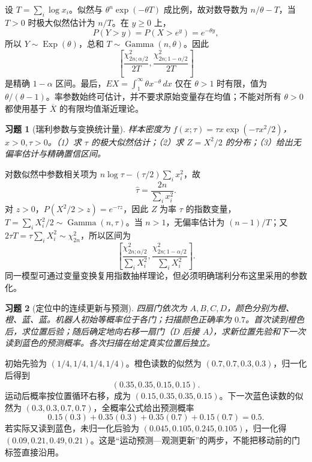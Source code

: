 \documentclass[UTF8,12pt,a4paper,fontset=fandol]{ctexart}
\newtheorem{exercise}{习题}[section]
\begin{document}
\begin{solve}\label{a:M-F-5}设 $T=\sum_i\log x_i$。似然与 $\theta^n\exp(-\theta T)$ 成比例，故对数导数为 $n/\theta-T$，当 $T>0$ 时极大似然估计为 $n/T$。在 $y\ge0$ 上，\[P(Y>y)=P(X>e^y)=e^{-\theta y},\]所以 $Y\sim\operatorname{Exp}(\theta)$，总和 $T\sim\operatorname{Gamma}(n,\theta)$。因此\[\left[\frac{\chi^2_{2n;\alpha/2}}{2T},\frac{\chi^2_{2n;1-\alpha/2}}{2T}\right]\]是精确 $1-\alpha$ 区间。最后，$EX=\int_1^\infty\theta x^{-\theta}\,dx$ 仅在 $\theta>1$ 时有限，值为 $\theta/(\theta-1)$。率参数始终可估计，并不要求原始变量存在均值；不能对所有 $\theta>0$ 都使用基于 $\overline X$ 的有限均值渐近理论。\end{solve}

\begin{exercise}[瑞利参数与变换统计量]\label{q:M-PF-26}
样本密度为 $f(x;\tau)=\tau x\exp(-\tau x^2/2)$，$x>0,\tau>0$。（1）求 $\tau$ 的极大似然估计；（2）求 $Z=X^2/2$ 的分布；（3）给出无偏率估计与精确置信区间。\par{}
\end{exercise}

\begin{solve}\label{a:M-PF-26}对数似然中参数相关项为 $n\log\tau-(\tau/2)\sum_i x_i^2$，故\[\widehat\tau=\frac{2n}{\sum_i x_i^2}.\]对 $z>0$，$P(X^2/2>z)=e^{-\tau z}$，因此 $Z$ 为率 $\tau$ 的指数变量，$T=\sum_iX_i^2/2\sim\operatorname{Gamma}(n,\tau)$。当 $n>1$，无偏率估计为 $(n-1)/T$；又 $2\tau T=\tau\sum_iX_i^2\sim\chi^2_{2n}$，所以区间为\[\left[\frac{\chi^2_{2n;\alpha/2}}{\sum_iX_i^2},\frac{\chi^2_{2n;1-\alpha/2}}{\sum_iX_i^2}\right].\]同一模型可通过变量变换复用指数抽样理论，但必须明确瑞利分布这里采用的参数化。\end{solve}

\begin{exercise}[定位中的连续更新与预测]\label{q:M-F-7}
四扇门依次为 $A,B,C,D$，颜色分别为橙、橙、蓝、蓝。机器人初始等概率位于各门；扫描颜色正确率为 $0.7$。首次读到橙色后，求位置后验；随后确定地向右移一扇门（$D$ 后接 $A$），求新位置先验和下一次读到蓝色的预测概率。各次扫描在给定真实位置后独立。\par{}
\end{exercise}

\begin{solve}\label{a:M-F-7}初始先验为 $(1/4,1/4,1/4,1/4)$。橙色读数的似然为 $(0.7,0.7,0.3,0.3)$，归一化后得到\[(0.35,0.35,0.15,0.15).\]运动后概率按位置循环右移，成为 $(0.15,0.35,0.35,0.15)$。下一次蓝色读数的似然为 $(0.3,0.3,0.7,0.7)$，全概率公式给出预测概率\[0.15(0.3)+0.35(0.3)+0.35(0.7)+0.15(0.7)=0.5.\]若实际又读到蓝色，未归一化后验为 $(0.045,0.105,0.245,0.105)$，归一化得 $(0.09,0.21,0.49,0.21)$。这是“运动预测—观测更新”的两步，不能把移动前的门标签直接沿用。\end{solve}
\end{document}
